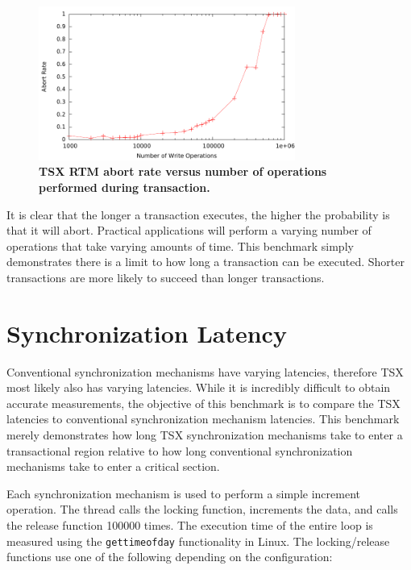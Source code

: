 \documentclass[11pt]{book}
\begin{document}
\begin{figure}
    \centering
    \graphicspath{ {./figures/} }
    \includegraphics[width=0.75\textwidth,keepaspectratio]{trxDuration}
    \caption{\textbf{TSX RTM abort rate versus number of operations performed during
        transaction.}}\label{fig:trx_duration}
\end{figure}

It is clear that the longer a transaction executes, the higher the probability is that it
will abort.  Practical applications will perform a varying number of operations that take
varying amounts of time.  This benchmark simply demonstrates there is a limit to how long
a transaction can be executed.  Shorter transactions are more likely to succeed than
longer transactions.

\section{Synchronization Latency}

Conventional synchronization mechanisms have varying latencies, therefore TSX most likely
also has varying latencies.  While it is incredibly difficult to obtain accurate
measurements, the objective of this benchmark is to compare the TSX latencies to
conventional synchronization mechanism latencies.  This benchmark merely demonstrates how
long TSX synchronization mechanisms take to enter a transactional region relative to how
long conventional synchronization mechanisms take to enter a critical section.

Each synchronization mechanism is used to perform a simple increment operation.  The
thread calls the locking function, increments the data, and calls the release function
100000 times.  The execution time of the entire loop is measured using the
\texttt{gettimeofday} functionality in Linux.  The locking/release functions use one of
the following depending on the configuration:
\end{document}
